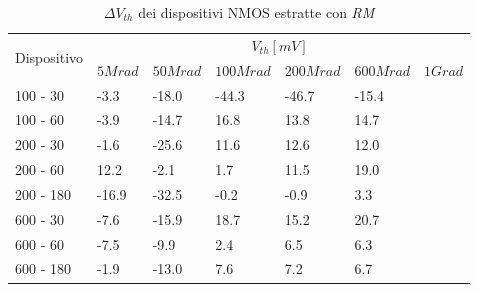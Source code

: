\documentclass[12pt, letterpaper]{book}
\begin{document}
\begin{table}[H]
  \renewcommand{\arraystretch}{1.3}
    \begin{tabular}{m{2cm}  m{1.1cm} m{1.3cm} m{1.5cm} m{1.5cm} m{1.5cm} m{1cm}}
      \toprule
      \multirow{2}{*}{Dispositivo} & \multicolumn{6}{c}{$V_{th} [mV] $}                                                                    \\
      \cmidrule{2-7}
                                   & $5Mrad$		& $50Mrad$& $100Mrad$ & $200Mrad$ & $600Mrad$ & $1Grad$ \\
      \midrule
      100 - 30               	& -3.3		& -18.0		& -44.3		& -46.7		& -15.4		&    \\
      \hline
      100 - 60                 	& -3.9		& -14.7		& 16.8		& 13.8		& 14.7		&    \\
      \hline
      200 - 30                  	& -1.6		& -25.6		& 11.6		& 12.6		& 12.0		&    \\
      \hline
      200 - 60                    & 12.2		& -2.1		& 1.7		& 11.5		& 19.0		&   \\
      \hline
      200 - 180				& -16.9		& -32.5 		& -0.2		& -0.9	& 3.3		&    \\
      \hline
      600 - 30                  	& -7.6		& -15.9		& 18.7		& 15.2		& 20.7		&    \\
      \hline
      600 - 60                    & -7.5 		& -9.9		& 2.4		& 6.5		& 6.3		&   \\
      \hline
      600 - 180              	& -1.9  		& -13.0		& 7.6		& 7.2		& 6.7		&  \\
      \bottomrule
    \end{tabular}
  \caption{$\Delta V_{th}$ dei dispositivi NMOS estratte con \emph{RM}}
  \label{tab:deltaVthRMN}
\end{table}
\end{document}
